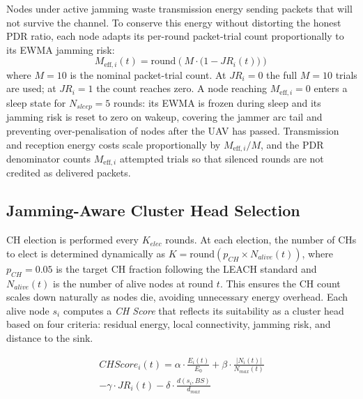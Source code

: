 \documentclass[conference]{IEEEtran}
\begin{document}
Nodes under active jamming waste transmission energy sending packets that
will not survive the channel. To conserve this energy without distorting
the honest PDR ratio, each node adapts its per-round packet-trial count
proportionally to its EWMA jamming risk:
\begin{equation}
    M_{\text{eff},i}(t) = \text{round}\!\left(M \cdot \bigl(1 - JR_i(t)\bigr)\right)
    \label{eq:meff}
\end{equation}
where $M = 10$ is the nominal packet-trial count. At $JR_i = 0$ the
full $M = 10$ trials are used; at $JR_i = 1$ the count reaches zero.
A node reaching $M_{\text{eff},i} = 0$ enters a sleep state for
$N_{sleep} = 5$ rounds: its EWMA is frozen during sleep and its jamming
risk is reset to zero on wakeup, covering the jammer arc tail and
preventing over-penalisation of nodes after the UAV has passed.
Transmission and reception energy costs scale proportionally by
$M_{\text{eff},i}/M$, and the PDR denominator counts
$M_{\text{eff},i}$ attempted trials so that silenced rounds are not
credited as delivered packets.

\subsection{Jamming-Aware Cluster Head Selection}

CH election is performed every $K_{elec}$ rounds. At each election, the
number of CHs to elect is determined dynamically as
$K = \text{round}(p_{CH} \times N_{alive}(t))$, where $p_{CH} = 0.05$
is the target CH fraction following the LEACH standard and $N_{alive}(t)$
is the number of alive nodes at round $t$. This ensures the CH count
scales down naturally as nodes die, avoiding unnecessary energy overhead.
Each alive node $s_i$ computes a \textit{CH Score} that reflects its
suitability as a cluster head based on four criteria: residual energy,
local connectivity, jamming risk, and distance to the sink.

\begin{multline}
    CHScore_i(t) = \alpha \cdot \frac{E_i(t)}{E_0}
    + \beta \cdot \frac{|N_i(t)|}{N_{max}(t)} \\
    - \gamma \cdot JR_i(t)
    - \delta \cdot \frac{d(s_i, BS)}{d_{max}}
\end{multline}
\end{document}
